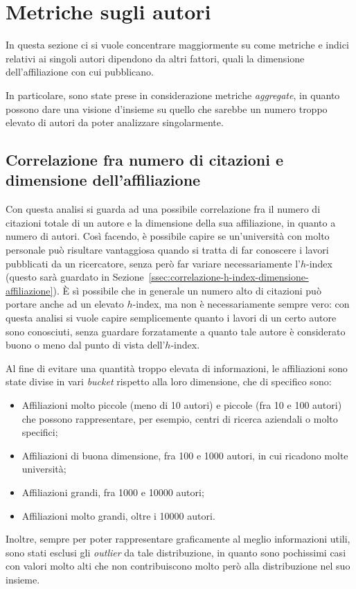 \section{Metriche sugli autori}

In questa sezione ci si vuole concentrare maggiormente su come metriche e
indici relativi ai singoli autori dipendono da altri fattori, quali la
dimensione dell'affiliazione con cui pubblicano.

In particolare, sono state prese in considerazione metriche \textit{aggregate},
in quanto possono dare una visione d'insieme su quello che sarebbe un numero
troppo elevato di autori da poter analizzare singolarmente.

\subsection{Correlazione fra numero di citazioni e dimensione dell'affiliazione}
\label{ssec:correlazione-citazioni-dimensione-affiliazione}

Con questa analisi si guarda ad una possibile correlazione fra il numero di
citazioni totale di un autore e la dimensione della sua affiliazione, in
quanto a numero di autori.
Così facendo, è possibile capire se un'università con molto personale
può risultare vantaggiosa quando si tratta di far conoscere i lavori pubblicati
da un ricercatore, senza però far variare necessariamente l'$h$-index (questo
sarà guardato in Sezione~\ref{ssec:correlazione-h-index-dimensione-affiliazione}).
È sì possibile che in generale un numero alto di citazioni può portare anche ad
un elevato $h$-index, ma non è necessariamente sempre vero: con questa analisi
si vuole capire semplicemente quanto i lavori di un certo autore sono conosciuti,
senza guardare forzatamente a quanto tale autore è considerato buono o meno
dal punto di vista dell'$h$-index.

Al fine di evitare una quantità troppo elevata di informazioni, le affiliazioni
sono state divise in vari \textit{bucket} rispetto alla loro dimensione, che
di specifico sono:
\begin{itemize}
  \item Affiliazioni molto piccole (meno di 10 autori) e piccole (fra 10 e
        100 autori) che possono rappresentare, per esempio, centri di ricerca
        aziendali o molto specifici;
  \item Affiliazioni di buona dimensione, fra 100 e 1000 autori, in cui
        ricadono molte università;
  \item Affiliazioni grandi, fra 1000 e 10000 autori;
  \item Affiliazioni molto grandi, oltre i 10000 autori.
\end{itemize}
%
Inoltre, sempre per poter rappresentare graficamente al meglio informazioni
utili, sono stati esclusi gli \textit{outlier} da tale distribuzione, in quanto
sono pochissimi casi con valori molto alti che non contribuiscono molto però
alla distribuzione nel suo insieme.

